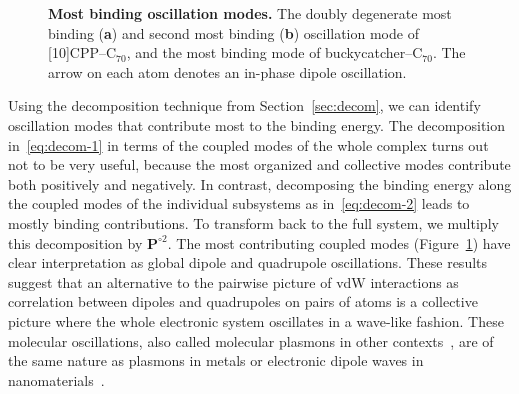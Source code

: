 \begin{figure}
{
}
\caption{\textbf{Most binding oscillation modes.}
The doubly degenerate most binding (\textbf a) and second most binding (\textbf b) oscillation mode of [10]CPP--C$_{70}$, and the most binding mode of buckycatcher--C$_{70}$.
The arrow on each atom denotes an in-phase dipole oscillation.
}\label{fig:mbd-modes}
\end{figure}

Using the decomposition technique from Section~\ref{sec:decom}, we can identify oscillation modes that contribute most to the binding energy.
The decomposition in~\eqref{eq:decom-1} in terms of the coupled modes of the whole complex turns out not to be very useful, because the most organized and collective modes contribute both positively and negatively.
In contrast, decomposing the binding energy along the coupled modes of the individual subsystems as in~\eqref{eq:decom-2} leads to mostly binding contributions.
To transform back to the full system, we multiply this decomposition by $\mathbf P^{\circ2}$.
The most contributing coupled modes (Figure~\ref{fig:mbd-modes}) have clear interpretation as global dipole and quadrupole oscillations.
These results suggest that an alternative to the pairwise picture of vdW interactions as correlation between dipoles and quadrupoles on pairs of atoms is a collective picture where the whole electronic system oscillates in a wave-like fashion.
These molecular oscillations, also called molecular plasmons in other contexts~\cite{LauchnerNL15}, are of the same nature as plasmons in metals or electronic dipole waves in nanomaterials~\cite{AmbrosettiS16}.

